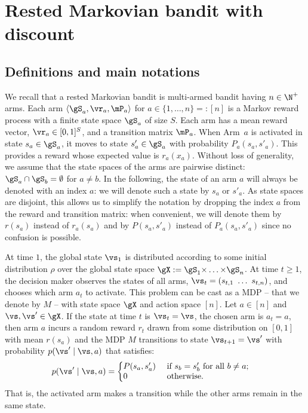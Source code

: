 \section{Rested Markovian bandit with discount}
\label{sec:bandits}


\subsection{Definitions and main notations}
\label{ssec:def}

We recall that a rested Markovian bandit is multi-armed bandit having $n\in\N^+$ arms. Each arm $\langle\gS_a,\vr_a,\mP_a\rangle$ for $a\in\{1,\dots, n\}=:[n]$ is a Markov
reward process with a finite state space $\gS_a$ of size $S$. Each arm has
a mean reward vector, $\vr_a\in[0,1]^S$, and a transition matrix
$\mP_a$. When Arm~$a$ is activated in state $s_a\in\gS_a$, it moves to
state $s'_a\in\gS_a$ with probability $P_a(s_a,s'_a)$. This provides a reward
whose expected value is $r_a(x_a)$. Without loss of generality, we assume
that the state spaces of the arms are pairwise distinct:
$\gS_a\cap\gS_b=\emptyset$ for $a\ne b$.  In the following, the state of an
arm $a$ will always be denoted with an index $a$: we will denote such a
state by $s_a$ or $s'_a$. As state spaces are disjoint, this allows us to
simplify the notation by dropping the index $a$ from the reward and transition
matrix: when convenient, we will denote them by $r(s_a)$ instead of $r_a(s_a)$
and by $P(s_a,s'_a)$ instead of $P_a(s_a,s'_a)$ since no confusion is possible. 

At time $1$, the global  state $\vs_1$ is distributed according to some initial
distribution $\rho$ over the global state space $\gX :=
\gS_1{\times}\dots{\times}\gS_n$. At time $t\ge 1$, the decision maker observes
the states
of all arms,
$\vs_t=(s_{t,1}\ \dots\ s_{t,n})$, and chooses which arm $a_t$ to activate.
This problem can be cast as a MDP -- that we denote by $M$ -- with state
space $\gX$ and action space \([n]\). Let $a\in[n]$ and $\vs,\vs'\in\gX$. If the state at time $t$ is $\vs_t=\vs$, the chosen arm is $a_t=a$, then arm $a$ incurs a random reward $r_t$ drawn from some distribution on \([0,1]\) with
mean \(r(s_a)\) and the MDP $M$ transitions to state $\vs_{t+1}=\vs'$ with probability \(p(\vs'\mid \vs,a)\) that satisfies:
\begin{align}
    \label{eq:defP}
    p(\vs' \mid \vs,a) 
    &= 
    \left\{
        \begin{array}{@{}ll@{}}
            P(s_a,s'_a) & \text{ if $s_{b}=s'_{b}$ for all $b\ne a$;}\\
            0 &\text{ otherwise}.
        \end{array}
    \right.
\end{align}
That is, the activated arm makes a transition while the other arms remain in
the same state.

